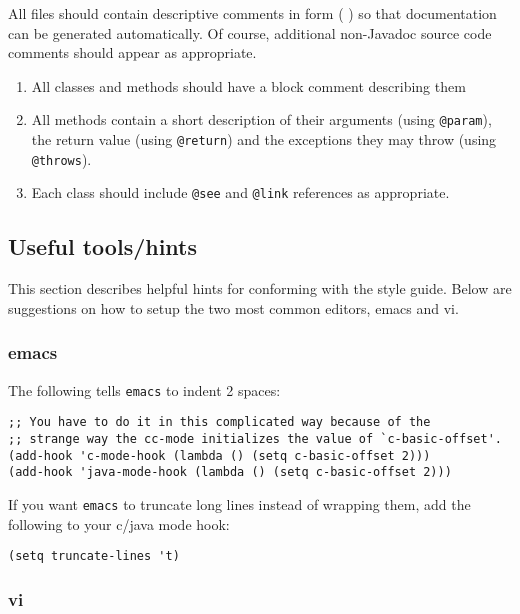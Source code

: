 All files should contain descriptive comments
in \JavadocTMweb{} form (
\xlink{{\tt \JavadocURL}} {\JavadocURL}
) so
that documentation can be generated automatically.  Of course,
additional non-Javadoc source code comments should appear as
appropriate.

\begin{enumerate}
\item All classes and methods should have a block comment describing
them
\item All methods contain a short description of their arguments
(using {\tt @param}), the return value (using {\tt @return}) and the
exceptions they may throw (using {\tt @throws}).
\item Each class should include {\tt @see} and {\tt @link} 
references as appropriate.
\end{enumerate}

\subsection {Useful tools/hints}

This section describes helpful hints for conforming with the style
guide.  Below are suggestions on how to setup the two most common
editors, emacs and vi. 

\subsubsection{emacs} 

The following tells {\tt emacs} to indent 2 spaces:
\begin{verbatim}
;; You have to do it in this complicated way because of the
;; strange way the cc-mode initializes the value of `c-basic-offset'.
(add-hook 'c-mode-hook (lambda () (setq c-basic-offset 2)))
(add-hook 'java-mode-hook (lambda () (setq c-basic-offset 2)))
\end{verbatim}
If you want {\tt emacs} to truncate long lines instead of wrapping them, add
the following to your c/java mode hook:
\begin{verbatim}
(setq truncate-lines 't)
\end{verbatim}

\subsubsection{vi}\label{options:vi/vim}

